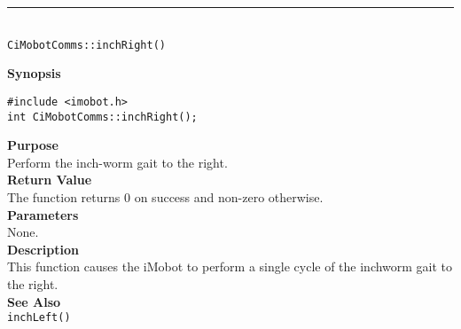 \noindent
\vspace{5pt}
\rule{4.5in}{0.015in}\\
\noindent
{\LARGE \texttt{CiMobotComms::inchRight()}}\\
{}

\noindent
{\bf Synopsis}\\
\begin{verbatim}
#include <imobot.h>
int CiMobotComms::inchRight();
\end{verbatim}

\noindent
{\bf Purpose}\\
Perform the inch-worm gait to the right.\\

\noindent
{\bf Return Value}\\
The function returns 0 on success and non-zero otherwise.\\

\noindent
{\bf Parameters}\\
None.\\

\noindent
{\bf Description}\\
This function causes the iMobot to perform a single cycle of the inchworm gait
to the right.\\

\noindent
{\bf See Also}\\
\texttt{inchLeft()}

